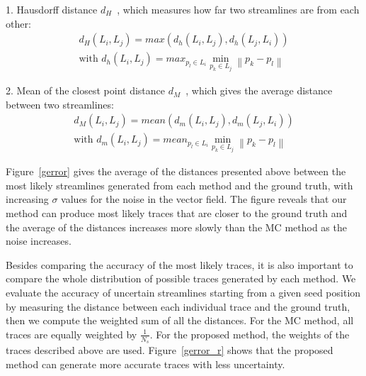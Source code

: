 1. Hausdorff distance $d_H$~\cite{Roessl:2012:TVCG}, which measures how far two streamlines are from each other:
\begin{equation}
\begin{split}
  {d_H}({L_i},{L_j}) = max({d_h}({L_i},{L_j}),{d_h}({L_j},{L_i})) \\
  \text{with  } {d_h}({L_i},{L_j}) = ma{x_{{p_l} \in {L_i}}}{\min _{{p_k} \in {L_j}}}\left\| {{p_k} - {p_l}} \right\|
\end{split}
\end{equation}

2. Mean of the closest point distance $d_M$~\cite{Corouge04towardsa}, which gives the average distance between two streamlines:
\begin{equation}
\begin{split}
  {d_M}({L_i},{L_j}) = mean({d_m}({L_i},{L_j}),{d_m}({L_j},{L_i})) \\
  \text{with  } {d_m}({L_i},{L_j}) = mea{n_{{p_l} \in {L_i}}}{\min _{{p_k} \in {L_j}}}\left\| {{p_k} - {p_l}} \right\|
\end{split}
\end{equation}

Figure~\ref{gerror} gives the average of the distances presented above between the most likely streamlines generated from each method and the ground truth, with increasing $\sigma$ values for the noise in the vector field. The figure reveals that our method can produce most likely traces that are closer to the ground truth and the average of the distances increases more slowly than the MC method as the noise increases.

Besides comparing the accuracy of the most likely traces, it is also important to compare the whole distribution of possible traces generated by each method. We evaluate the accuracy of uncertain streamlines starting from a given seed position by measuring the distance between each individual trace and the ground truth, then we compute the weighted sum of all the distances. For the MC method, all traces are equally weighted by $\frac{1}{N_s}$. For the proposed method, the weights of the traces described above are used. Figure~\ref{gerror_r} shows that the proposed method can generate more accurate traces with less uncertainty.

